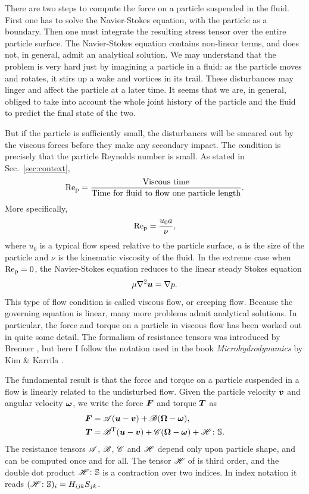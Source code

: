 \documentclass[thesis.tex]{subfiles}
\begin{document}
There are two steps to compute the force on a particle suspended in the fluid. First one has to solve the Navier-Stokes equation, with the particle as a boundary. Then one must integrate the resulting stress tensor over the entire particle surface. The Navier-Stokes equation  contains non-linear terms, and does not, in general, admit an analytical solution. We may understand that the problem is very hard just by imagining a particle in a fluid: as the particle moves and rotates, it stirs up a wake and vortices in its trail. These disturbances may linger and affect the particle at a later time. It seems that we are, in general, obliged to take into account the whole joint history of the particle and the fluid to predict the final state of the two.

But if the particle is sufficiently small, the disturbances will be smeared out by the viscous forces before they make any secondary impact. The condition is precisely that the particle Reynolds number is small. As stated in Sec.~\ref{sec:context},
\begin{align*}
 	\mbox{Re}_{\mathrm p} = \frac{\textrm{Viscous time}}{\textrm{Time for fluid to flow one particle length}}.
\end{align*}
More specifically,
\begin{align*}
	\mbox{Re}_{\mathrm p} = \frac{u_0 a}{\nu},
\end{align*}
where $u_0$ is a typical flow speed relative to the particle surface, $a$ is the size of the particle and $\nu$ is the kinematic viscosity of the fluid. In the extreme case when $\mbox{Re}_{\mathrm p}=0$, the Navier-Stokes equation  reduces to the linear steady Stokes equation \cite{kim1991,kundu2004}
\begin{align*}
	\mu \nabla^2 \mbox{\boldmath$u$} = \nabla p.
\end{align*}
This type of flow condition is called viscous flow, or creeping flow. Because the governing equation is linear, many more problems admit analytical solutions. In particular, the force and torque on a particle in viscous flow has been worked out in quite some detail. The formalism of resistance tensors was introduced by Brenner \cite{brenner1974, happel1965}, but here I follow the notation used in the book \emph{Microhydrodynamics} by Kim \& Karrila \cite{kim1991}.

The fundamental result is that the force and torque on a particle suspended in a flow is linearly related to the undisturbed flow. Given the particle velocity $\mbox{\boldmath$v$}$ and angular velocity $\mbox{\boldmath$\omega$}$, we write the force $\mbox{\boldmath$F$}$ and torque $\mbox{\boldmath$T$}$ as
\begin{align}
	\ve F &= \te A (\ve u - \ve v) + \te B (\ve \Omega - \ve \omega), \nn \\
	\ve T &= \te B\transpose (\ve u - \ve v) + \te C (\ve \Omega - \ve \omega) + \te H \dd \ma S. \eqnlab{resistanceformulation}
\end{align}
The resistance tensors $\mathscr{A}$, $\mathscr{B}$, $\mathscr{C}$ and $\mathscr{H}$ depend only upon particle shape, and can be computed once and for all. The tensor $\mathscr{H}$ of is third order, and the double dot product $\mathscr{H} \colon \mathbb{S}$ is a contraction over two indices. In index notation it reads $(\mathscr{H} \colon \mathbb{S})_i = H_{ijk}S_{jk}$. 
\end{document}

